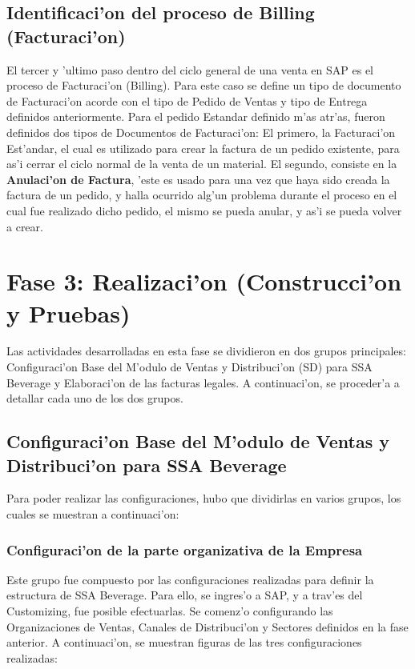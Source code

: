 \subsection{Identificaci'on del proceso de Billing (Facturaci'on)}
	El tercer y 'ultimo paso dentro del ciclo general de una venta en SAP es el proceso de Facturaci'on (Billing). Para este caso se define un tipo de documento de Facturaci'on acorde con el tipo de Pedido de Ventas y tipo de Entrega definidos anteriormente.
	Para el pedido Estandar definido m'as atr'as, fueron definidos dos tipos de Documentos de Facturaci'on: El primero, la Facturaci'on Est'andar, el cual es utilizado para crear la factura de un pedido existente, para as'i cerrar el ciclo normal de la venta de un material. El segundo, consiste en la \textbf{Anulaci'on de Factura}, 'este es usado para una vez que haya sido creada la factura de un pedido, y halla ocurrido alg'un problema durante el proceso en el cual fue realizado dicho pedido, el mismo se pueda anular, y as'i se pueda volver a crear.

\section{Fase 3: Realizaci'on (Construcci'on y Pruebas)}
	Las actividades desarrolladas en esta fase se dividieron en dos grupos principales: Configuraci'on Base del M'odulo de Ventas y Distribuci'on (SD) para SSA Beverage y Elaboraci'on de las facturas legales.
	A continuaci'on, se proceder'a a detallar cada uno de los dos grupos.
\subsection{Configuraci'on Base del M'odulo de Ventas y Distribuci'on para SSA Beverage}
	Para poder realizar las configuraciones, hubo que dividirlas en varios grupos, los cuales se muestran a continuaci'on:
\subsubsection{Configuraci'on de la parte organizativa de la Empresa}
	Este grupo fue compuesto por las configuraciones realizadas para definir la estructura de SSA Beverage. Para ello, se ingres'o a SAP, y a trav'es del Customizing, fue posible efectuarlas. Se comenz'o configurando las Organizaciones de Ventas, Canales de Distribuci'on y Sectores definidos en la fase anterior. A continuaci'on, se muestran figuras de las tres configuraciones realizadas:
	
